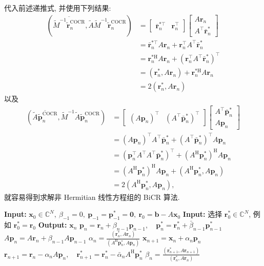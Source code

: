 {代入前述递推式, 并使用下列结果:}
\[\begin{aligned}
(\overline{\widetilde M^{-1}\widetilde{\bm r}_n^{\mathrm{COCR}}},\widetilde A\widetilde M^{-1}\widetilde{\bm r}_n^{\mathrm{COCR}})&=\begin{bmatrix}\bar{\bm r}_n^{*\top}&\bm r_n^{\top}\end{bmatrix}\begin{bmatrix}A\bm r_n\\A^{\top}\bar{\bm r}_n^{*}\end{bmatrix}\\
&=\bar{\bm r}_n^{*\top}A\bm r_n+\bm r_n^{\top}A^{\top}\bar{\bm r}_n^{*}\\
&=\bm r_n^{*\mathrm H}A\bm r_n+(\bm r_n^{\top}A^{\top}\bar{\bm r}_n^{*})^{\top}\\
&=(\bm r_n^{*},A\bm r_n)+\bm r_n^{*\mathrm H}A\bm r_n\\
&=2(\bm r_n^{*},A\bm r_n)
\end{aligned}\]
{以及}
\[\begin{aligned}
(\overline{\widetilde A\widetilde{\bm p}_n^{\mathrm{COCR}}},\widetilde M^{-1}\widetilde A\widetilde{\bm p}_n^{\mathrm{COCR}})&=\begin{bmatrix}(A\bm p_n)^{\top}&(A^{\top}\bar{\bm p}_n^{*})^{\top}\end{bmatrix}\begin{bmatrix}A^{\top}\bar{\bm p}_n^{*}\\A\bm p_n\end{bmatrix}\\
&=(A\bm p_n)^{\top}A^{\top}\bar{\bm p}_n^{*}+(A^{\top}\bar{\bm p}_n^{*})^{\top}A\bm p_n\\
&=(\bm p_n^{\top}A^{\top}A^{\top}\bar{\bm p}_n^{*})^{\top}+(A^{\mathrm H}\bm p_n^{*})^{\mathrm H}A\bm p_n\\
&=(A^{\mathrm H}\bm p_n^{*})^{\mathrm H}A\bm p_n+(A^{\mathrm H}\bm p_n^{*},A\bm p_n)\\
&=2(A^{\mathrm H}\bm p_n^{*},A\bm p_n),
\end{aligned}\]
{就容易得到求解非 Hermitian 线性方程组的 BiCR 算法.}
\begin{algorithm}[H]\caption{{BiCR 方法}}\label{alg:bicr}\begin{algorithmic}[1]
\Statex\textbf{Input:} $\bm x_0\in\mathbb C^N,\ \beta_{-1}=0,\ \bm p_{-1}=\bm p_{-1}^{*}=\bm0,\ \bm r_0=\bm b-A\bm x_0$
\Statex\textbf{Input:} {选择 $\bm r_0^{*}\in\mathbb C^N$, 例如 $\bm r_0^{*}=\bm r_0$}
\Statex\textbf{Output:} $\bm x_n$
\State $\bm p_n=\bm r_n+\beta_{n-1}\bm p_{n-1},\quad\bm p_n^{*}=\bm r_n^{*}+\bar\beta_{n-1}\bm p_{n-1}^{*}$
\State $A\bm p_n=A\bm r_n+\beta_{n-1}A\bm p_{n-1}$
\State $\alpha_n=\frac{(\bm r_n^{*},A\bm r_n)}{(A^{\mathrm H}\bm p_n^{*},A\bm p_n)}$
\State $\bm x_{n+1}=\bm x_n+\alpha_n\bm p_n$
\State $\bm r_{n+1}=\bm r_n-\alpha_nA\bm p_n,\quad\bm r_{n+1}^{*}=\bm r_n^{*}-\bar\alpha_nA^{\mathrm H}\bm p_n^{*}$
\State $\beta_n=\frac{(\bm r_{n+1}^{*},A\bm r_{n+1})}{(\bm r_n^{*},A\bm r_n)}$
\EndFor\end{algorithmic}\end{algorithm}
